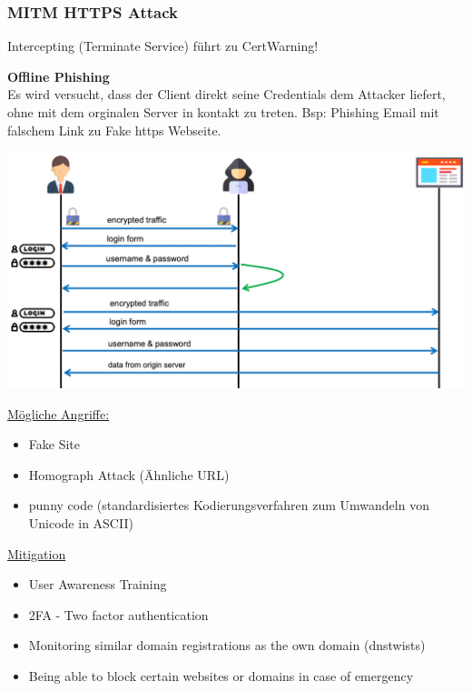 \subsubsection{MITM HTTPS Attack}
Intercepting (Terminate Service) führt zu CertWarning!

\textbf{Offline Phishing}\\
Es wird versucht, dass der Client direkt seine Credentials dem Attacker liefert, ohne mit dem orginalen Server in kontakt zu treten. Bsp: Phishing Email mit falschem Link zu Fake https Webseite.
\begin{center}
    \vspace{-8pt}
    \includegraphics[width=.8\linewidth]{./img/09-mitm/fake_https_page}
    \vspace{-8pt}
\end{center}
\underline{Mögliche Angriffe:}
\begin{itemize}
    \item Fake Site
    \item Homograph Attack (Ähnliche URL)
    \item punny code (standardisiertes Kodierungsverfahren zum Umwandeln von Unicode in ASCII)
\end{itemize}
\underline{Mitigation}
\begin{itemize}
    \item User Awareness Training
    \item 2FA - Two factor authentication
    \item Monitoring similar domain registrations as the own domain (dnstwists)
    \item Being able to block certain websites or domains in case of emergency
\end{itemize}

